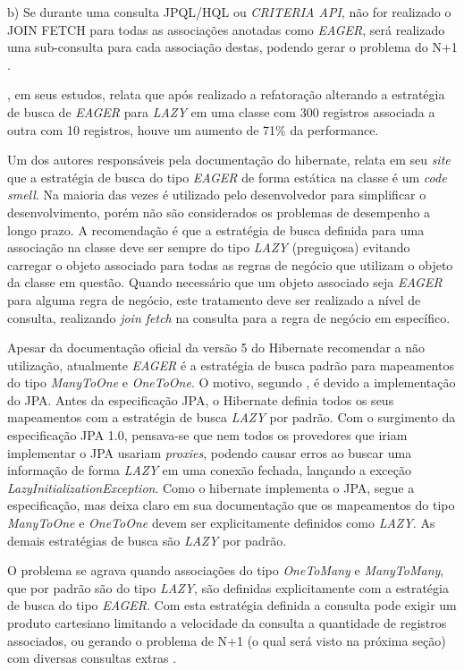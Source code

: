 b) Se durante uma consulta JPQL/HQL ou \textit{CRITERIA API}, não for realizado o JOIN FETCH para todas as associações anotadas como \textit{EAGER}, será realizado uma sub-consulta para cada associação destas, podendo gerar o problema do N+1  \citep{hibernate_543}.

\cite{Chen:2014:Performance:Anti-patterns}, em seus estudos, relata que após realizado a refatoração alterando a estratégia de busca de \textit{EAGER} para \textit{LAZY} em uma classe com 300 registros associada a outra com 10 registros, houve um aumento de 71\% da performance.

Um dos autores responsáveis pela documentação do hibernate, \cite{vlad_mihalcea_2019} relata em seu \textit{site} que a estratégia de busca do tipo \textit{EAGER} de forma estática na classe é um \textit{code smell}. Na maioria das vezes é utilizado pelo desenvolvedor para simplificar o desenvolvimento, porém não são considerados os problemas de desempenho a longo prazo. A recomendação é que a estratégia de busca definida para uma associação na classe deve ser sempre do tipo \textit{LAZY} (preguiçosa) evitando carregar o objeto associado para todas as regras de negócio que utilizam o objeto da classe em questão. Quando necessário que um objeto associado seja \textit{EAGER} para alguma regra de negócio, este tratamento deve ser realizado a nível de consulta, realizando \textit{join fetch} na consulta para a regra de negócio em específico.

Apesar da documentação oficial da versão 5 do Hibernate recomendar a não utilização, atualmente \textit{EAGER} é a estratégia de busca padrão para mapeamentos do tipo \textit{ManyToOne} e \textit{OneToOne}. O motivo, segundo \cite{hibernate_543}, é devido a implementação do JPA. Antes da especificação JPA, o Hibernate definia todos os seus mapeamentos com a estratégia de busca \textit{LAZY} por padrão. Com o surgimento da especificação JPA 1.0, pensava-se que nem todos os provedores que iriam implementar o JPA usariam \textit{proxies}, podendo causar erros ao buscar uma informação de forma \textit{LAZY} em uma conexão fechada, lançando a exceção \textit{LazyInitializationException}. Como o hibernate implementa o JPA, segue a especificação, mas deixa claro em sua documentação que os mapeamentos do tipo \textit{ManyToOne} e \textit{OneToOne} devem ser explicitamente definidos como \textit{LAZY}. As demais estratégias de busca são \textit{LAZY} por padrão.

O problema se agrava quando associações do tipo \textit{OneToMany} e \textit{ManyToMany}, que por padrão são do tipo \textit{LAZY}, são definidas explicitamente com a estratégia de busca do tipo \textit{EAGER}. Com esta estratégia definida a consulta pode exigir um produto cartesiano limitando a velocidade da consulta a quantidade de registros associados, ou gerando o problema de N+1 (o qual será visto na próxima seção) com diversas consultas extras \citep{high_perform_vlad}.

